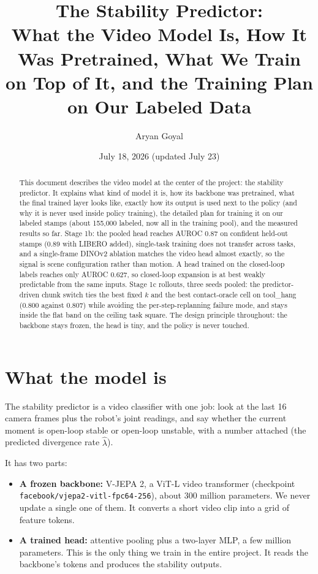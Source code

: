 \documentclass[11pt]{article}
\title{The Stability Predictor:\\ \large What the Video Model Is, How It Was Pretrained,
What We Train on Top of It, and the Training Plan on Our Labeled Data}
\author{Aryan Goyal}
\date{July 18, 2026 (updated July 23)}
\begin{document}
\maketitle

\begin{abstract}
\noindent
This document describes the video model at the center of the project: the stability
predictor. It explains what kind of model it is, how its backbone was pretrained,
what the final trained layer looks like, exactly how its output is used next to the
policy (and why it is never used inside policy training), the detailed plan for
training it on our labeled stamps (about 155{,}000 labeled, now all in the
training pool), and the measured results so far. Stage 1b: the pooled head reaches
AUROC 0.87 on confident held-out stamps (0.89 with LIBERO added), single-task
training does not transfer across tasks, and a single-frame DINOv2 ablation
matches the video head almost exactly, so the signal is scene configuration
rather than motion. A head trained on the closed-loop labels reaches only
AUROC 0.627, so closed-loop expansion is at best weakly predictable from the
same inputs. Stage 1c rollouts, three seeds pooled: the predictor-driven
chunk switch ties the best fixed $k$ and the best contact-oracle cell on
tool\_hang (0.800 against 0.807) while avoiding the per-step-replanning failure
mode, and stays inside the flat band on the ceiling task square. The design
principle throughout: the backbone stays frozen, the head is tiny, and the policy
is never touched.
\end{abstract}

\tableofcontents
\newpage

\section{What the model is}

The stability predictor is a video classifier with one job: look at the last 16
camera frames plus the robot's joint readings, and say whether the current moment is
open-loop stable or open-loop unstable, with a number attached (the predicted
divergence rate $\hat\lambda$).

It has two parts:

\begin{itemize}[leftmargin=2em]
  \item \textbf{A frozen backbone:} V-JEPA 2, a ViT-L video transformer
    (checkpoint \texttt{facebook/vjepa2-vitl-fpc64-256}), about 300 million
    parameters. We never update a single one of them. It converts a short video
    clip into a grid of feature tokens.
  \item \textbf{A trained head:} attentive pooling plus a two-layer MLP, a few
    million parameters. This is the only thing we train in the entire project.
    It reads the backbone's tokens and produces the stability outputs.
\end{itemize}
\end{document}
